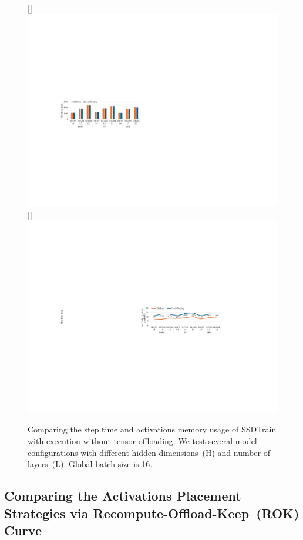 \begin{figure}[!t]
\centering
\subcaptionbox{}
[\linewidth]{\includegraphics[scale=1.4]{figures/SSDTrain/eval_perf_a.pdf}}
\subcaptionbox{}
[\linewidth]{\includegraphics[scale=1.4]{figures/SSDTrain/eval_perf_b.pdf}}
\caption{\label{fig:eval_perf} Comparing the step time and activations memory usage of SSDTrain with execution without tensor offloading. We test several model configurations with different hidden dimensions~(H) and number of layers~(L). Global batch size is 16.}
\end{figure}



\subsection{Comparing the Activations Placement Strategies via Recompute-Offload-Keep~(ROK) Curve}
\label{sec:exp_dse}


